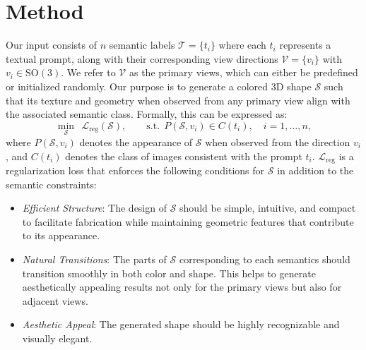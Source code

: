 \section{Method}
Our input consists of $n$ semantic labels $\mathcal{T} = \{t_i\}$ where each $t_i$ represents a textual prompt, along with their corresponding view directions $\mathcal{V} = \{v_i\}$ with $v_i\in \mathrm{SO\left(3\right)}$. We refer to $\mathcal{V}$ as the primary views, which can either be predefined or initialized randomly. Our purpose is to generate a colored 3D shape $\mathcal{S}$ such that its texture and geometry when observed from any primary view align with the associated semantic class. Formally, this can be expressed as:
\begin{equation}
\min_{\mathcal{S}} ~~ \mathcal{L}_{\mathrm{reg}}(\mathcal{S}), 
\qquad \text{s.t.} ~~ P(\mathcal{S}, v_{i}) \in C\left(t_{i}\right), \quad i = 1, \ldots, n,
\label{eq:main}
\end{equation}
where $P(\mathcal{S}, v_{i})$ denotes the appearance of $\mathcal{S}$ when observed from the direction $v_{i}$, and $C\left(t_{i}\right)$ denotes the class of images consistent with the prompt $t_{i}$. $\mathcal{L}_{\mathrm{reg}}$ is a regularization loss that enforces the following conditions for $\mathcal{S}$ in addition to the semantic constraints:
\begin{itemize}[leftmargin=*]
\item \textit{Efficient Structure}: The design of $\mathcal{S}$ should be simple, intuitive, and compact to facilitate fabrication while maintaining geometric features that contribute to its appearance.
\item \textit{Natural Transitions}: The parts of $\mathcal{S}$ corresponding to each semantics should transition smoothly in both color and shape. This helps to generate aesthetically appealing results not only for the primary views but also for adjacent views. 
\item \textit{Aesthetic Appeal}: The generated shape should be highly recognizable and visually elegant.
\end{itemize}

